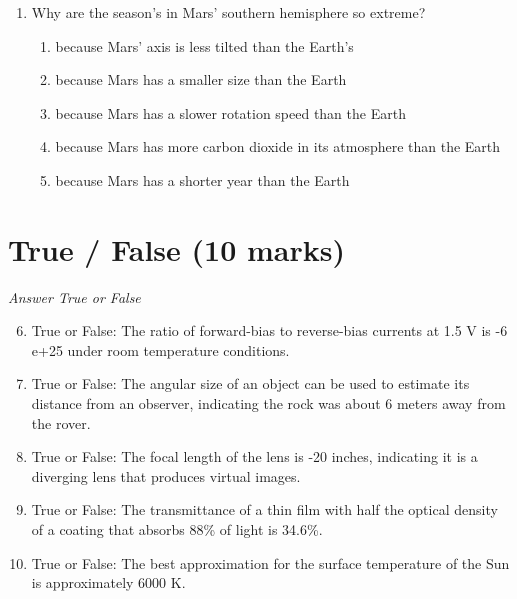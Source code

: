 \documentclass[12pt]{article}
\begin{document}
\begin{enumerate}[label=\arabic*.]
\begin{enumerate}[label=(\alph*)]
    \item (f / 3)
    \item (f / 2)
    \item (5 f / 3)
    \item (6 f / 5)
    \item (3 f / 4)
\end{enumerate}
\item Why are the season's in Mars' southern hemisphere so extreme?
\begin{enumerate}[label=(\alph*)]
    \item because Mars' axis is less tilted than the Earth's
    \item because Mars has a smaller size than the Earth
    \item because Mars has a slower rotation speed than the Earth
    \item because Mars has more carbon dioxide in its atmosphere than the Earth
    \item because Mars has a shorter year than the Earth
\end{enumerate}
\end{enumerate}

\section*{True / False (10 marks)}
\textit{Answer True or False}
\begin{enumerate}[label=\arabic*.]
\setcounter{enumi}{5}
\item True or False: The ratio of forward-bias to reverse-bias currents at 1.5 V is -6 e+25 under room temperature conditions.
\item True or False: The angular size of an object can be used to estimate its distance from an observer, indicating the rock was about 6 meters away from the rover.
\item True or False: The focal length of the lens is -20 inches, indicating it is a diverging lens that produces virtual images.
\item True or False: The transmittance of a thin film with half the optical density of a coating that absorbs 88\% of light is 34.6\%.
\item True or False: The best approximation for the surface temperature of the Sun is approximately 6000 K.
\end{enumerate}
\end{document}
